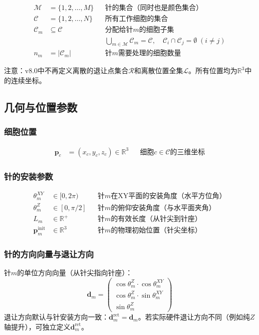 \documentclass[11pt,a4paper]{article}
\begin{document}
\begin{align}
    \mathcal{M} &= \{1, 2, \ldots, M\} && \text{针的集合（同时也是颜色集合）} \\
    \mathcal{C} &= \{1, 2, \ldots, N\} && \text{所有工作细胞的集合} \\
    \mathcal{C}_m &\subseteq \mathcal{C} && \text{分配给针$m$的细胞子集} \\
    && & \bigcup_{m \in \mathcal{M}} \mathcal{C}_m = \mathcal{C}, \quad \mathcal{C}_i \cap \mathcal{C}_j = \emptyset \; (i \neq j) \\
    n_m &= |\mathcal{C}_m| && \text{针$m$需要处理的细胞数量}
\end{align}

注意：v8.0中不再定义离散的退让点集合$\mathcal{R}$和离散位置全集$\mathcal{L}$。所有位置均为$\mathbb{R}^3$中的连续坐标。

\subsection{几何与位置参数}

\subsubsection{细胞位置}
\begin{align}
    \mathbf{p}_c &= (x_c, y_c, z_c) \in \mathbb{R}^3 && \text{细胞$c \in \mathcal{C}$的三维坐标}
\end{align}

\subsubsection{针的安装参数}
\begin{align}
    \theta_m^{XY} &\in [0, 2\pi) && \text{针$m$在XY平面的安装角度（水平方位角）} \\
    \theta_m^{Z} &\in [0, \pi/2] && \text{针$m$的俯仰安装角度（与水平面夹角）} \\
    L_m &\in \mathbb{R}^+ && \text{针$m$的有效长度（从针尖到针座）} \\
    \mathbf{p}_m^{\text{init}} &\in \mathbb{R}^3 && \text{针$m$的物理初始位置（针尖坐标）}
\end{align}

\subsubsection{针的方向向量与退让方向}
针$m$的单位方向向量（从针尖指向针座）：
\begin{equation}
    \mathbf{d}_m = \begin{pmatrix}
        \cos\theta_m^{Z} \cdot \cos\theta_m^{XY} \\
        \cos\theta_m^{Z} \cdot \sin\theta_m^{XY} \\
        \sin\theta_m^{Z}
    \end{pmatrix}
\end{equation}
退让方向默认与针安装方向一致：$\mathbf{d}_m^{\text{ret}} = \mathbf{d}_m$。若实际硬件退让方向不同（例如纯$Z$轴提升），可独立定义$\mathbf{d}_m^{\text{ret}}$。
\end{document}
